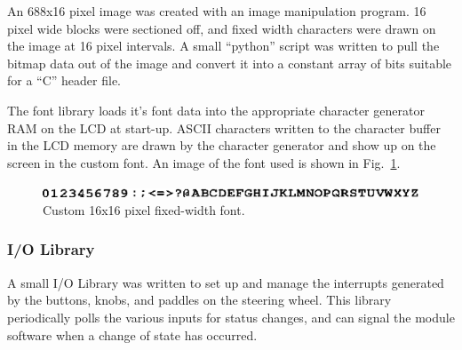 An 688x16 pixel image was created with an image manipulation program. 16 pixel wide blocks were sectioned off, and fixed width characters were drawn on the image at 16 pixel intervals. A small ``python'' script was written to pull the bitmap data out of the image and convert it into a constant array of bits suitable for a ``C'' header file.

The font library loads it's font data into the appropriate character generator RAM on the LCD at start-up. ASCII characters written to the character buffer in the LCD memory are drawn by the character generator and show up on the screen in the custom font. An image of the font used is shown in Fig.\ \ref{fig:driver_interface_font}.

\begin{figure}[htp]
 \centering
 \includegraphics[scale=1]{implementation/figures/driver_interface_font.eps}
 \caption{Custom 16x16 pixel fixed-width font.}
 \label{fig:driver_interface_font}
\end{figure}

\subsubsection{I/O Library}

A small I/O Library was written to set up and manage the interrupts generated by the buttons, knobs, and paddles on the steering wheel. This library periodically polls the various inputs for status changes, and can signal the module software when a change of state has occurred.
